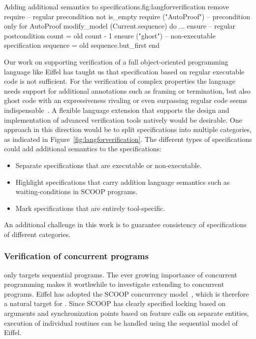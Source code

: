 \begin{efigure}[!ht]{Adding additional semantics to specifications.}{fig:langforverification}
remove
	require -- regular precondition
		not is_empty
	require ("AutoProof") -- precondition only for AutoProof
		modify_model (Current.sequence)
	do ...
	ensure -- regular postcondition
		count = old count - 1
	ensure ("ghost") -- non-executable specification
		sequence = old sequence.but_first
	end
\end{efigure}

Our work on supporting verification of a full object-oriented programming language like Eiffel has taught us that specification based on regular executable code is not sufficient.
For the verification of complex properties the language needs support for additional annotations such as framing or termination, but also ghost code with an expressiveness rivaling or even surpassing regular code seems indispensable~\cite{FILLIATRE14}.
A flexible language extension that supports the design and implementation of advanced verification tools natively would be desirable.
One approach in this direction would be to split specifications into multiple categories, as indicated in Figure~\ref{fig:langforverification}.
The different types of specifications could add additional semantics to the specifications:
\begin{itemize}
\item Separate specifications that are executable or non-executable.
\item Highlight specifications that carry addition language semantics such as waiting-conditions in SCOOP programs.
\item Mark specifications that are entirely tool-specific.
\end{itemize}
An additional challenge in this work is to guarantee consistency of specifications of different categories.


\subsubsection{Verification of concurrent programs}

\AutoProof only targets sequential programs. The ever growing importance of concurrent programming makes it worthwhile to investigate extending \AutoProof to concurrent programs. Eiffel has adopted the SCOOP concurrency model~\cite{MEYER97,NIENALTOWSKI07}, which is therefore a natural target for \AutoProof.
Since SCOOP has clearly specified locking based on  arguments and synchronization points based on feature calls on separate entities, execution of individual routines can be handled using the sequential model of Eiffel.

